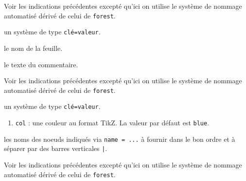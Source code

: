 \documentclass[12pt,a4paper]{article}
\begin{document}
\separation


 \hfill {}

\extraspace
\extraspace

Voir les indications précédentes excepté qu'ici on utilise le système de nommage automatisé dérivé de celui de \verb#forest#.


\separation



\IDoption{} un système de type \texttt{clé=valeur}.


 le nom de la feuille.

 le texte du commentaire.


\separation



\extraspace
\extraspace

Voir les indications précédentes excepté qu'ici on utilise le système de nommage automatisé dérivé de celui de \verb#forest#.


\separation





\IDoption{} un système de type \texttt{clé=valeur}.

\begin{enumerate}
	\item \verb#col# : une couleur au format TikZ. La valeur par défaut est \verb#blue#.
\end{enumerate}

\IDarg{} les noms des noeuds indiqués via \verb#name = ...# à fournir dans le bon ordre et à séparer par des barres verticales \verb#|#.


\separation





\extraspace
\extraspace

Voir les indications précédentes excepté qu'ici on utilise le système de nommage automatisé dérivé de celui de \verb#forest#.
\end{document}
